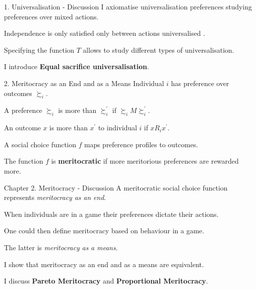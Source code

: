 \documentclass[usenames,dvipsnames,aspectratio=169,11pt,handout]{beamer}
\begin{document}
\begin{frame}{1. Universalisation - Discussion}
	I axiomatise universalisation preferences studying preferences over mixed actions.

	\vfill

	Independence is only satisfied only between actions universalised .

	\vfill

	Specifying the function \( T \) allows to study different types of universalisation.

	\vfill

	I introduce \textbf{Equal sacrifice universalisation}.

\end{frame}

\begin{frame}{2. Meritocracy as an End and as a Means}
	Individual \( i \) has preference over outcomes \( \succsim_i \).

	\vfill

	A preference \( \succsim_i \) is more  than \( \succsim_i^{\prime} \) if \( \succsim_i M \succsim_i^{\prime} \).

	\vfill

	An outcome \( x \) is more  than \( x^{\prime} \) to individual \( i \) if \( x R_i x^{\prime} \).

	\vfill

	A social choice function \( f \) maps preference profiles to outcomes.

	\vfill

	The function \( f \) is \textbf{meritocratic} if more meritorious preferences are rewarded more.

\end{frame}

\begin{frame}{Chapter 2. Meritocracy - Discussion}
	A meritocratic social choice function represents \textit{meritocracy as an end}.

	\vfill

	When individuals are in a game their preferences dictate their actions.

	\vfill

	One could then define meritocracy based on behaviour in a game.

	\vfill

	The latter is \textit{meritocracy as a means}.

	\vfill

	I show that meritocracy as an end and as a means are equivalent.
	\vfill

	I discuss \textbf{Pareto Meritocracy} and \textbf{Proportional Meritocracy}.

\end{frame}
\end{document}
